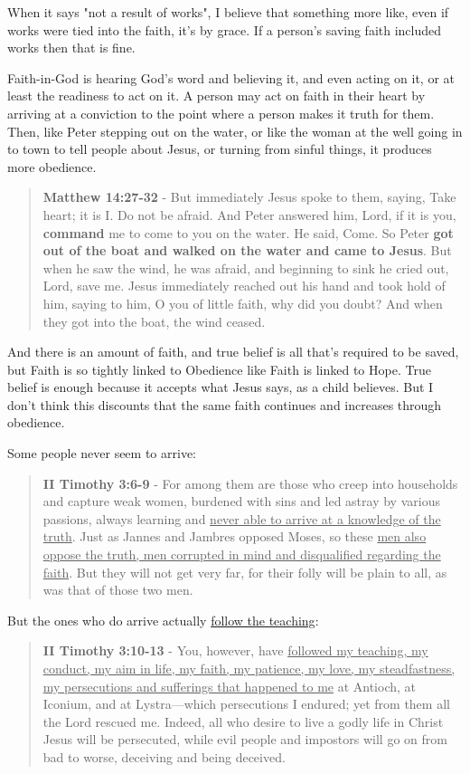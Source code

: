 \documentclass[11pt]{article}
\begin{document}
When it says "not a result of works", I believe that something more like, even if works were tied into the faith, it's by grace. If a person's saving faith included works then that is fine.

Faith-in-God is hearing God's word and believing it, and even acting on it, or at least the readiness to act on it.
A person may act on faith in their heart by arriving at a conviction to the point where a person makes it truth for them.
Then, like Peter stepping out on the water, or like the woman at the well going in to town to tell people about Jesus, or turning from sinful things, it produces more obedience.

\begin{quote}
\textbf{Matthew 14:27-32} - But immediately Jesus spoke to them, saying, Take heart; it is I. Do not be afraid. And Peter answered him, Lord, if it is you, \textbf{command} me to come to you on the water. He said, Come. So Peter \textbf{got out of the boat and walked on the water and came to Jesus}. But when he saw the wind, he was afraid, and beginning to sink he cried out, Lord, save me. Jesus immediately reached out his hand and took hold of him, saying to him, O you of little faith, why did you doubt? And when they got into the boat, the wind ceased.
\end{quote}

And there is an amount of faith, and true belief is all that's required to be saved, but Faith is so tightly linked to Obedience like Faith is linked to Hope. True belief is enough because it accepts what Jesus says, as a child believes. But I don't think this discounts that the same faith continues and increases through obedience.

Some people never seem to arrive:

\begin{quote}
\textbf{II Timothy 3:6-9} - For among them are those who creep into households and capture weak women, burdened with sins and led astray by various passions, always learning and \uline{never able to arrive at a knowledge of the truth}. Just as Jannes and Jambres opposed Moses, so these \uline{men also oppose the truth, men corrupted in mind and disqualified regarding the faith}. But they will not get very far, for their folly will be plain to all, as was that of those two men.
\end{quote}

But the ones who do arrive actually \uline{follow the teaching}:

\begin{quote}
\textbf{II Timothy 3:10-13} - You, however, have \uline{followed my teaching, my conduct, my aim in life, my faith, my patience, my love, my steadfastness, my persecutions and sufferings that happened to me} at Antioch, at Iconium, and at Lystra—which persecutions I endured; yet from them all the Lord rescued me. Indeed, all who desire to live a godly life in Christ Jesus will be persecuted, while evil people and impostors will go on from bad to worse, deceiving and being deceived.
\end{quote}
\end{document}
